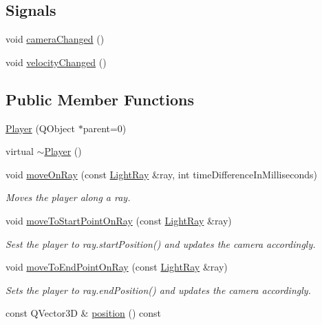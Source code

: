 \subsection*{Signals}
\begin{DoxyCompactItemize}
\item 
void \hyperlink{class_player_aef620bc75871b32311560a7b2a31c144}{camera\+Changed} ()
\item 
void \hyperlink{class_player_a22ae3d9604e92fa12cfad39fe40e8651}{velocity\+Changed} ()
\end{DoxyCompactItemize}
\subsection*{Public Member Functions}
\begin{DoxyCompactItemize}
\item 
\hyperlink{class_player_a5c2a46dbacbc28b7cfbe352b6c0db644}{Player} (Q\+Object $\ast$parent=0)
\item 
virtual \hyperlink{class_player_a749d2c00e1fe0f5c2746f7505a58c062}{$\sim$\+Player} ()
\item 
void \hyperlink{class_player_a6dcd0b9f4d678260314878ab20ce6e09}{move\+On\+Ray} (const \hyperlink{class_light_ray}{Light\+Ray} \&ray, int time\+Difference\+In\+Milliseconds)
\begin{DoxyCompactList}\small\item\em Moves the player along a ray. \end{DoxyCompactList}\item 
void \hyperlink{class_player_a38269e0706f91b71c6e8f8373c397969}{move\+To\+Start\+Point\+On\+Ray} (const \hyperlink{class_light_ray}{Light\+Ray} \&ray)
\begin{DoxyCompactList}\small\item\em Sest the player to ray.\+start\+Position() and updates the camera accordingly. \end{DoxyCompactList}\item 
void \hyperlink{class_player_a0a4ebefb0f7593d79573ddcfe68e8e2f}{move\+To\+End\+Point\+On\+Ray} (const \hyperlink{class_light_ray}{Light\+Ray} \&ray)
\begin{DoxyCompactList}\small\item\em Sets the player to ray.\+end\+Position() and updates the camera accordingly. \end{DoxyCompactList}\item 
const Q\+Vector3\+D \& \hyperlink{class_player_a0c307c67d3c6d64ee9c5b724c1e2b095}{position} () const 

\end{DoxyCompactItemize}
